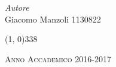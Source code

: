 \documentclass[a4paper, 11pt]{article} %
\begin{document}
\begin{titlepage}
\begin{center}
		\vspace{10pt} 
		
		\vspace{60pt} 
		
		\begin{large}
			
			\begin{flushright}
				\textit{Autore}\\ 
				\vspace{5pt} 
				Giacomo Manzoli 1130822
			\end{flushright}
		\end{large}
		
		\vspace{160pt}
		
		\line(1, 0){338} \\
		\begin{normalsize}
			\textsc{Anno Accademico 2016-2017}
		\end{normalsize}
		
	\end{center}
\end{titlepage} 





	
	
	\clearpage
	\tableofcontents
	
	
	
\end{document}

